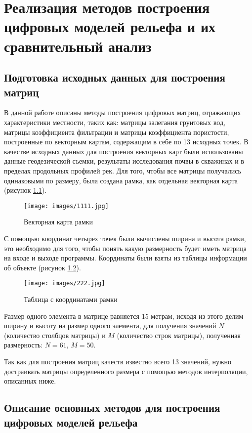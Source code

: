 \chapter{Реализация методов построения цифровых моделей рельефа и их сравнительный анализ}

\section{Подготовка исходных данных для построения матриц }

В данной работе описаны методы построения цифровых матриц, отражающих характеристики местности, таких как: матрицы залегания грунтовых вод, матрицы коэффициента фильтрации и матрицы коэффициента пористости, построенные по векторным картам, содержащим в себе по 13 исходных точек. В качестве исходных данных для построения векторных карт были использованы данные геодезической съемки, результаты исследования почвы в скважинах и в пределах продольных профилей рек. Для того, чтобы все матрицы получались одинаковыми по размеру, была создана рамка, как отдельная векторная карта (рисунок \ref{fig:9}).

\begin{figure}[h!]
    \center
    \texttt{[image: images/1111.jpg]}
    \caption{Векторная карта рамки}
    \label{fig:9}
\end{figure}


С помощью координат четырех точек были вычислены ширина и высота рамки, это необходимо для того, чтобы понять какую размерность будет иметь матрица на входе и выходе программы. Координаты были взяты из таблицы информации об объекте (рисунок \ref{fig:10}).

\begin{figure}[h!]
    \center
    \texttt{[image: images/222.jpg]}
    \caption{Таблица с координатами рамки}
    \label{fig:10}
\end{figure}

Размер одного элемента в матрице равняется 15 метрам, исходя из этого делим ширину и высоту на размер одного элемента, для получения значений $N$ (количество столбцов матрицы) и $M$ (количество строк матрицы), полученная размерность: $N = 61$,  $M = 50$.

Так как для построения матриц качеств известно всего 13 значений, нужно достраивать матрицы определенного размера с помощью методов интерполяции, описанных ниже.

\section{Описание основных методов для построения цифровых моделей рельефа}

